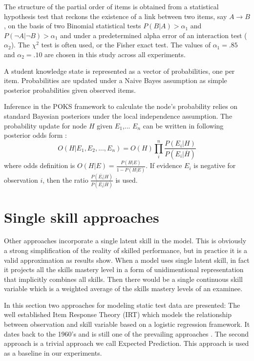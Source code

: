 The structure of the partial order of items is obtained from a statistical hypothesis test that reckons the existence of a link between two items, say $A \rightarrow B$, on the basis of two Binomial statistical tests $P(B|A) > \alpha_1$ and $P(\neg A|\neg B) > \alpha_1$ and under a predetermined alpha error of an interaction test ($\alpha_2$).  The $\chi^2$ test is often used, or the Fisher exact test.  The values of $\alpha_1 = .85$ and $\alpha_2 = .10$ are chosen in this study across all experiments.

A student knowledge state is represented as a vector of probabilities, one per item.  Probabilities are updated under a Naive Bayes assumption as simple posterior probabilities given observed items.

Inference in the POKS framework to calculate the node's probability relies on standard Bayesian posteriors under the local independence assumption. The probability update for node $H$ given $E_1$,... $E_n$ can be written in following posterior odds form :
\begin{equation}
O(H|E_1,E_2, ... , E_n) = O(H) \prod_{i}^{n} \frac{P(E_i|H)}{P(E_i | \overline{H})}
\label{EQPOKSratio}
\end{equation}
where odds definition is $O(H|E) = \frac{P(H|E)}{1-P(H|E)}$. If evidence $E_i$ is negative for observation $i$, then the ratio $\frac{P(\overline{E_i}|H)}{P(\overline{E_i}|\overline{H})}$ is used.

\section{Single skill approaches}

Other approaches incorporate a single latent skill in the model. This is obviously a strong simplification of the reality of skilled performance, but in practice it is a valid approximation as results show. When a model uses single latent skill, in fact it projects all the skills mastery level in a form of unidimentional representation that implicitly combines all skills. Then there would be a single continuous skill variable which is a weighted average of the skills mastery levels of an examinee. 

In this section two approaches for modeling static test data are presented: The well established Item Response Theory (IRT) which models the relationship between observation and skill variable based on a logistic regression framework. It dates back to the 1960's and is still one of the prevailing approaches \citep{bakerKim2004}.  The second approach is a trivial approach we call Expected Prediction. This approach is used as a baseline in our experiments.

